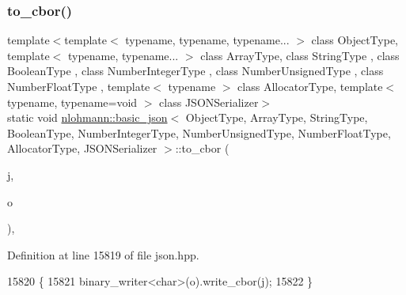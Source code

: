 \subsubsection{\texorpdfstring{to\+\_\+cbor()}{to\_cbor()}\hspace{0.1cm}{\footnotesize\ttfamily [3/3]}}
{\footnotesize\ttfamily template$<$template$<$ typename, typename, typename... $>$ class Object\+Type, template$<$ typename, typename... $>$ class Array\+Type, class String\+Type , class Boolean\+Type , class Number\+Integer\+Type , class Number\+Unsigned\+Type , class Number\+Float\+Type , template$<$ typename $>$ class Allocator\+Type, template$<$ typename, typename=void $>$ class J\+S\+O\+N\+Serializer$>$ \\
static void \hyperlink{classnlohmann_1_1basic__json}{nlohmann\+::basic\+\_\+json}$<$ Object\+Type, Array\+Type, String\+Type, Boolean\+Type, Number\+Integer\+Type, Number\+Unsigned\+Type, Number\+Float\+Type, Allocator\+Type, J\+S\+O\+N\+Serializer $>$\+::to\+\_\+cbor (\begin{DoxyParamCaption}\item[{const \hyperlink{classnlohmann_1_1basic__json}{basic\+\_\+json}$<$ Object\+Type, Array\+Type, String\+Type, Boolean\+Type, Number\+Integer\+Type, Number\+Unsigned\+Type, Number\+Float\+Type, Allocator\+Type, J\+S\+O\+N\+Serializer $>$ \&}]{j,  }\item[{\hyperlink{classnlohmann_1_1detail_1_1output__adapter}{detail\+::output\+\_\+adapter}$<$ char $>$}]{o }\end{DoxyParamCaption})\hspace{0.3cm}{\ttfamily [inline]}, {\ttfamily [static]}}



Definition at line 15819 of file json.\+hpp.


\begin{DoxyCode}
15820     \{
15821         binary\_writer<char>(o).write\_cbor(j);
15822     \}
\end{DoxyCode}
\mbox{\label{classnlohmann_1_1basic__json_a09ca1dc273d226afe0ca83a9d7438d9c}} 

